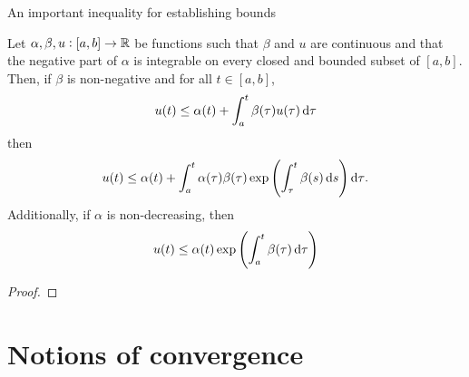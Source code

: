 
An important inequality for establishing bounds

\begin{theorem}\label{thm:gronwall}
	Let \(\alpha, \beta, u: [a,b] \to \mathbb{R}\) be functions such that \(\beta\) and \(u\) are continuous and that the negative part of \(\alpha\) is integrable on every closed and bounded subset of \([a,b]\).
	Then, if \(\beta\) is non-negative and for all \(t \in [a,b]\),
	\[
		u(t) \leq \alpha(t) + \int_a^t{\beta(\tau)u(\tau)\dif\tau}
	\]
	then
	\[
		u(t) \leq \alpha(t) + \int_a^t{\alpha(\tau)\beta(\tau)\exp\left(\int_\tau^{t}{\beta(s)\dif s}\right)\dif\tau}.
	\]
	Additionally, if \(\alpha\) is non-decreasing, then
	\[
		u(t) \leq \alpha(t) \exp\left(\int_a^t{\beta(\tau)\dif\tau}\right)
	\]
\end{theorem}
\begin{proof}

\end{proof}






\section{Notions of convergence}


